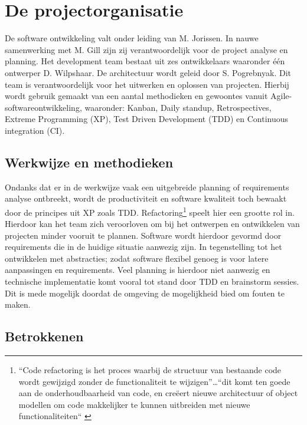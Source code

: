 \clearpage

\section{De projectorganisatie} %

De software ontwikkeling valt onder leiding van M. Jorissen. In nauwe samenwerking met M. Gill zijn zij verantwoordelijk voor de project analyse en planning. Het development team bestaat uit zes ontwikkelaars waaronder één ontwerper D. Wilpshaar.
De architectuur wordt geleid door S. Pogrebnyak. Dit team is verantwoordelijk voor het uitwerken en oplossen van projecten. Hierbij wordt gebruik gemaakt van een aantal methodieken en gewoontes vanuit Agile-softwareontwikkeling, waaronder: Kanban, Daily standup, Retrospectives, Extreme Programming (XP), Test Driven Development (TDD) en Continuous integration (CI).

    \subsection{Werkwijze en methodieken}

    Ondanks dat er in de werkwijze vaak een uitgebreide planning of requirements analyse ontbreekt, wordt de productiviteit en software kwaliteit toch bewaakt door de principes uit XP zoals TDD. Refactoring\footnote{“Code refactoring is het proces waarbij de structuur van bestaande code wordt gewijzigd zonder de functionaliteit te wijzigen”…“dit komt ten goede aan de onderhoudbaarheid van code, en creëert nieuwe architectuur of object modellen om code makkelijker te kunnen uitbreiden met nieuwe functionaliteiten“ \parencite{refactorruby}} speelt hier een grootte rol in.
    Hierdoor kan het team zich veroorloven om bij het ontwerpen en ontwikkelen van projecten minder vooruit te plannen. Software wordt hierdoor gevormd door requirements die in de huidige situatie aanwezig zijn. In tegenstelling tot het ontwikkelen met abstracties; zodat software flexibel genoeg is voor latere aanpassingen en requirements. Veel planning is hierdoor niet aanwezig en technische implementatie komt vooral tot stand door TDD en brainstorm sessies. Dit is mede mogelijk doordat de omgeving de mogelijkheid bied om fouten te maken.

    \subsection{Betrokkenen}
    
